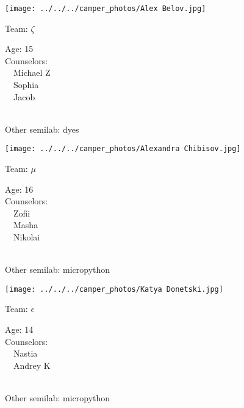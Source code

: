 \documentclass[10pt,letterpaper, landscape]{article}
\begin{document}
\horizontalshiftfornextsticker
\renewcommand{\baselinestretch}{1} \begin{sticker}
\noindent\begin{minipage}{0.5\textwidth}\texttt{[image: ../../../camper\_photos/Alex Belov.jpg]}\end{minipage}\begin{minipage}{0.45\textwidth}
Team: {\Large $\zeta$}

Age:        15\\
Counselors: \\\ \ Michael Z\\\ \ Sophia\\\ \ Jacob\\
\end{minipage} \\ \vspace{0.07in}
Other semilab: dyes
\end{sticker}
\verticalshiftfornextsticker
\renewcommand{\baselinestretch}{1} \begin{sticker}
\noindent\begin{minipage}{0.5\textwidth}\texttt{[image: ../../../camper\_photos/Alexandra Chibisov.jpg]}\end{minipage}\begin{minipage}{0.45\textwidth}
Team: {\Large $\mu$}

Age:        16\\
Counselors: \\\ \ Zofii\\\ \ Masha\\\ \ Nikolai\\
\end{minipage} \\ \vspace{0.07in}
Other semilab: micropython
\end{sticker}
\horizontalshiftfornextsticker
\renewcommand{\baselinestretch}{1} \begin{sticker}
\noindent\begin{minipage}{0.5\textwidth}\texttt{[image: ../../../camper\_photos/Katya Donetski.jpg]}\end{minipage}\begin{minipage}{0.45\textwidth}
Team: {\Large $\epsilon$}

Age:        14\\
Counselors: \\\ \ Nastia\\\ \ Andrey K\\
\end{minipage} \\ \vspace{0.07in}
Other semilab: micropython
\end{sticker}
\end{document}
